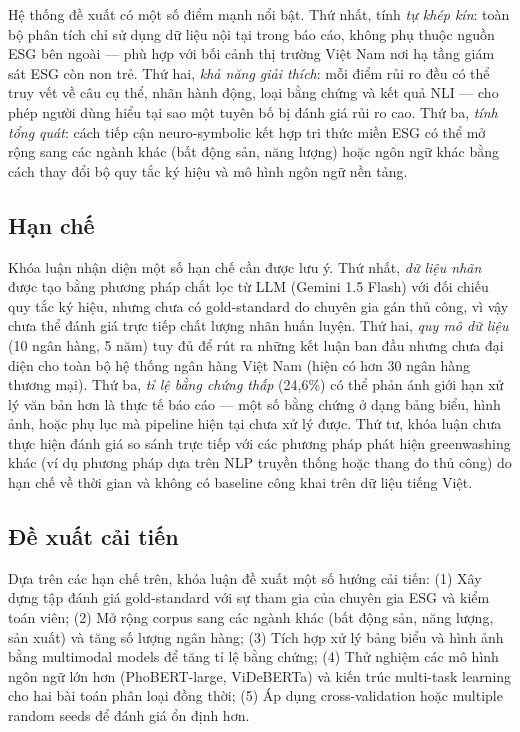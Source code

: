 Hệ thống đề xuất có một số điểm mạnh nổi bật. Thứ nhất, tính \textit{tự khép kín}: toàn bộ phân tích chỉ sử dụng dữ liệu nội tại trong báo cáo, không phụ thuộc nguồn ESG bên ngoài --- phù hợp với bối cảnh thị trường Việt Nam nơi hạ tầng giám sát ESG còn non trẻ. Thứ hai, \textit{khả năng giải thích}: mỗi điểm rủi ro đều có thể truy vết về câu cụ thể, nhãn hành động, loại bằng chứng và kết quả NLI --- cho phép người dùng hiểu tại sao một tuyên bố bị đánh giá rủi ro cao. Thứ ba, \textit{tính tổng quát}: cách tiếp cận neuro-symbolic kết hợp tri thức miền ESG có thể mở rộng sang các ngành khác (bất động sản, năng lượng) hoặc ngôn ngữ khác bằng cách thay đổi bộ quy tắc ký hiệu và mô hình ngôn ngữ nền tảng.


\subsection{Hạn chế}
\label{subsec:limitations}

Khóa luận nhận diện một số hạn chế cần được lưu ý. Thứ nhất, \textit{dữ liệu nhãn} được tạo bằng phương pháp chắt lọc từ LLM (Gemini 1.5 Flash) với đối chiếu quy tắc ký hiệu, nhưng chưa có gold-standard do chuyên gia gán thủ công, vì vậy chưa thể đánh giá trực tiếp chất lượng nhãn huấn luyện. Thứ hai, \textit{quy mô dữ liệu} (10 ngân hàng, 5 năm) tuy đủ để rút ra những kết luận ban đầu nhưng chưa đại diện cho toàn bộ hệ thống ngân hàng Việt Nam (hiện có hơn 30 ngân hàng thương mại). Thứ ba, \textit{tỉ lệ bằng chứng thấp} (24,6\%) có thể phản ánh giới hạn xử lý văn bản hơn là thực tế báo cáo --- một số bằng chứng ở dạng bảng biểu, hình ảnh, hoặc phụ lục mà pipeline hiện tại chưa xử lý được. Thứ tư, khóa luận chưa thực hiện đánh giá so sánh trực tiếp với các phương pháp phát hiện greenwashing khác (ví dụ phương pháp dựa trên NLP truyền thống hoặc thang đo thủ công) do hạn chế về thời gian và không có baseline công khai trên dữ liệu tiếng Việt.


\subsection{Đề xuất cải tiến}
\label{subsec:future_work}

Dựa trên các hạn chế trên, khóa luận đề xuất một số hướng cải tiến: (1) Xây dựng tập đánh giá gold-standard với sự tham gia của chuyên gia ESG và kiểm toán viên; (2) Mở rộng corpus sang các ngành khác (bất động sản, năng lượng, sản xuất) và tăng số lượng ngân hàng; (3) Tích hợp xử lý bảng biểu và hình ảnh bằng multimodal models để tăng tỉ lệ bằng chứng; (4) Thử nghiệm các mô hình ngôn ngữ lớn hơn (PhoBERT-large, ViDeBERTa) và kiến trúc multi-task learning cho hai bài toán phân loại đồng thời; (5) Áp dụng cross-validation hoặc multiple random seeds để đánh giá ổn định hơn.

